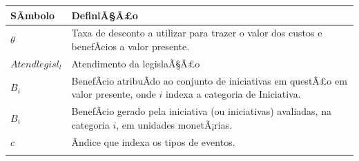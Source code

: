 \documentclass[]{article}
\begin{document}
\begin{longtable}[]{@{}ll@{}}
\toprule
\begin{minipage}[b]{0.07\columnwidth}\raggedright\strut
\textbf{SÃ­mbolo}\strut
\end{minipage} & \begin{minipage}[b]{0.87\columnwidth}\raggedright\strut
\textbf{DefiniÃ§Ã£o}\strut
\end{minipage}\tabularnewline
\midrule
\endhead
\begin{minipage}[t]{0.07\columnwidth}\raggedright\strut
\(\theta\)\strut
\end{minipage} & \begin{minipage}[t]{0.87\columnwidth}\raggedright\strut
Taxa de desconto a utilizar para trazer o valor dos custos e benefÃ­cios
a valor presente.\strut
\end{minipage}\tabularnewline
\begin{minipage}[t]{0.07\columnwidth}\raggedright\strut
\(Atendlegisl_{l}\)\strut
\end{minipage} & \begin{minipage}[t]{0.87\columnwidth}\raggedright\strut
Atendimento da legislaÃ§Ã£o\strut
\end{minipage}\tabularnewline
\begin{minipage}[t]{0.07\columnwidth}\raggedright\strut
\(B_{i}\)\strut
\end{minipage} & \begin{minipage}[t]{0.87\columnwidth}\raggedright\strut
BenefÃ­cio atribuÃ­do ao conjunto de iniciativas em questÃ£o em valor
presente, onde \(i\) indexa a categoria de Iniciativa.\strut
\end{minipage}\tabularnewline
\begin{minipage}[t]{0.07\columnwidth}\raggedright\strut
\(B_i\)\strut
\end{minipage} & \begin{minipage}[t]{0.87\columnwidth}\raggedright\strut
BenefÃ­cio gerado pela iniciativa (ou iniciativas) avaliadas, na
categoria \(i\), em unidades monetÃ¡rias.\strut
\end{minipage}\tabularnewline
\begin{minipage}[t]{0.07\columnwidth}\raggedright\strut
\(c\)\strut
\end{minipage} & \begin{minipage}[t]{0.87\columnwidth}\raggedright\strut
Ãndice que indexa os tipos de eventos.\strut
\end{minipage}\tabularnewline
\begin{minipage}[t]{0.07\columnwidth}\raggedright\strut

\end{minipage}
\end{longtable}
\end{document}
